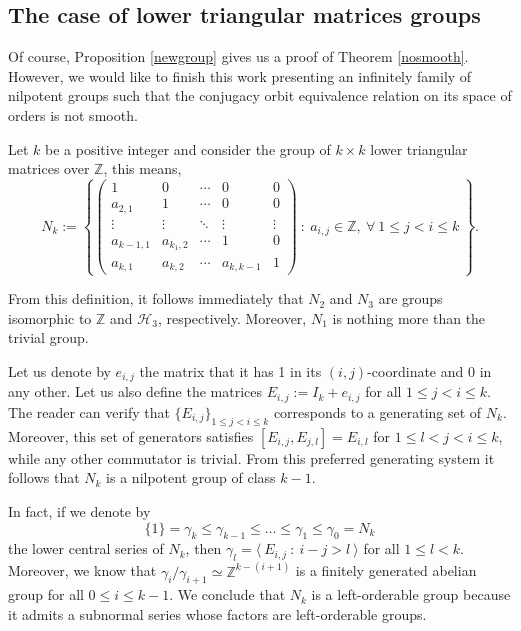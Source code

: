\documentclass[12pt]{article}
\theoremstyle{definition}
\begin{document}
\subsection{The case of lower triangular matrices groups}

Of course, Proposition \ref{newgroup} gives us a proof of Theorem \ref{nosmooth}. However, we would like to finish this work presenting an infinitely family of nilpotent groups such that the conjugacy orbit equivalence relation on its space of orders is not smooth.

Let $k$ be a positive integer and consider the group of $k\times k$ lower triangular matrices over $\mathbb{Z}$, this means, 
\begin{equation}
\label{presentation}
N_k:=\left \{ \left ( 
\begin{array}{ccccc}
    1 & 0 & \dotsm & 0 & 0 \\
    a_{2,1} & 1 & \dotsm & 0 & 0\\ 
    \vdots & \vdots & \ddots & \vdots & \vdots\\
    a_{k-1,1} & a_{k_1,2} & \dotsm & 1 & 0\\
    a_{k,1} & a_{k,2} & \dotsm & a_{k,k-1} & 1
\end{array}\right )\ :\ a_{i,j}\in \mathbb{Z},\ \forall\ 1\leq j<i\leq k\  \right \}.
\end{equation}

From this definition, it follows immediately that $N_2$ and $N_3$ are groups isomorphic to $\mathbb{Z}$ and $\mathcal{H}_3$, respectively. Moreover, $N_1$ is nothing more than the trivial group. 

Let us denote by $e_{i,j}$ the matrix that it has 1 in its $(i,j)$-coordinate and $0$ in any other. Let us also define the matrices $E_{i,j}:=I_k+ e_{i,j}$ for all $1\leq j<i\leq k$. The reader can verify that $\{E_{i,j}\}_{1\leq j<i\leq k}$ corresponds to a generating set of $N_k$. Moreover, this set of generators satisfies $[E_{i,j},E_{j,l}]=E_{i,l}$ for $1\leq l<j<i\leq k$, while any other commutator is trivial. From this preferred generating system it follows that $N_k$ is a nilpotent group of class $k-1$. 


In fact, if we denote by 
$$\{1\}=\gamma_k\leq \gamma_{k-1}\leq \dots \leq \gamma_1\leq \gamma_0=N_k$$
the lower central series of $N_k$, then $\gamma_l=\langle\ E_{i,j}\ :\ i-j>l \ \rangle$ for all $1\leq l<k$. Moreover, we know that $\gamma_i/\gamma_{i+1}\simeq \mathbb{Z}^{k-(i+1)} $ is a finitely generated abelian group for all $0\leq i \leq k-1$. 
We conclude that $N_k$ is a left-orderable group because it admits a subnormal series whose factors are left-orderable groups.
\end{document}
